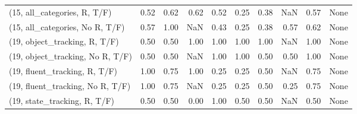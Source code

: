 \begin{table*}[h!]
\begin{adjustbox}{width=2\columnwidth,center}
\begin{tabular}{lrrr|rrr|rrr}
(15, all\_categories, R, T/F)          &                      0.52 &                  0.62 &                      0.62 &                          0.52 &                      0.25 &                          0.38 &                                    NaN &                               0.57 &                                  None \\
(15, all\_categories, No R, T/F)       &                      0.57 &                  1.00 &                       NaN &                          0.43 &                      0.25 &                          0.38 &                                   0.57 &                               0.62 &                                  None \\



\midrule
(19, object\_tracking, R, T/F)         &                      0.50 &                  0.50 &                      1.00 &                          1.00 &                      1.00 &                          1.00 &                                    NaN &                               1.00 &                                  None \\
(19, object\_tracking, No R, T/F)      &                      0.50 &                  0.50 &                       NaN &                          1.00 &                      1.00 &                          0.50 &                                   0.50 &                               1.00 &                                  None \\
(19, fluent\_tracking, R, T/F)         &                      1.00 &                  0.75 &                      1.00 &                          0.25 &                      0.25 &                          0.50 &                                    NaN &                               0.75 &                                  None \\
(19, fluent\_tracking, No R, T/F)      &                      1.00 &                  0.75 &                       NaN &                          0.25 &                      0.25 &                          0.50 &                                   0.25 &                               0.75 &                                  None \\
(19, state\_tracking, R, T/F)          &                      0.50 &                  0.50 &                      0.00 &                          1.00 &                      0.50 &                          0.50 &                                    NaN &                               0.50 &                                  None \\

\end{tabular}
\end{adjustbox}
\end{table*}
